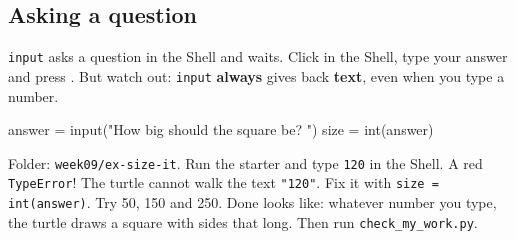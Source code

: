 \subsection{Asking a question}
\texttt{input} asks a question in the Shell and waits. Click in the Shell, type your answer and press . But watch out: \texttt{input} \textbf{always} gives back \textbf{text}, even when you type a number.
\begin{center}
\end{center}
\begin{pycode}
answer = input("How big should the square be? ")
size = int(answer)
\end{pycode}

\begin{exercise}
Folder: \texttt{week09/ex-size-it}. Run the starter and type \texttt{120} in the Shell. A red \texttt{TypeError}! The turtle cannot walk the text \texttt{"120"}. Fix it with \texttt{size = int(answer)}. Try 50, 150 and 250.
Done looks like: whatever number you type, the turtle draws a square with sides that long. Then run \texttt{check\_my\_work.py}.
\end{exercise}

